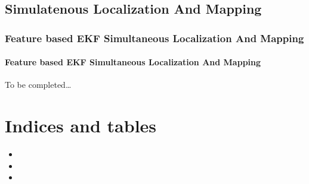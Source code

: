 \documentclass[letterpaper,10pt,english]{sphinxmanual}
\begin{document}
\section{Simulatenous Localization And Mapping}
\label{\detokenize{Localization_index:simulatenous-localization-and-mapping}}

\subsection{Feature based EKF Simultaneous Localization And Mapping}
\label{\detokenize{Localization_index:feature-based-ekf-simultaneous-localization-and-mapping}}
\sphinxstepscope


\subsubsection{Feature based EKF Simultaneous Localization And Mapping}
\label{\detokenize{FEKFSLAM:feature-based-ekf-simultaneous-localization-and-mapping}}\label{\detokenize{FEKFSLAM::doc}}
\sphinxAtStartPar
To be completed…


\begin{savenotes}\sphinxattablestart
\sphinxthistablewithglobalstyle
\sphinxthistablewithnovlinesstyle
\centering
\begin{tabulary}{\linewidth}[t]{}
\sphinxtoprule
\sphinxtableatstartofbodyhook\sphinxbottomrule
\end{tabulary}
\sphinxtableafterendhook\par
\sphinxattableend\end{savenotes}


\chapter{Indices and tables}
\label{\detokenize{index:indices-and-tables}}\begin{itemize}
\item {} 
\sphinxAtStartPar
{}

\item {} 
\sphinxAtStartPar
{}

\item {} 
\sphinxAtStartPar
{}

\end{itemize}



\renewcommand{\indexname}{Index}
\printindex
\end{document}

